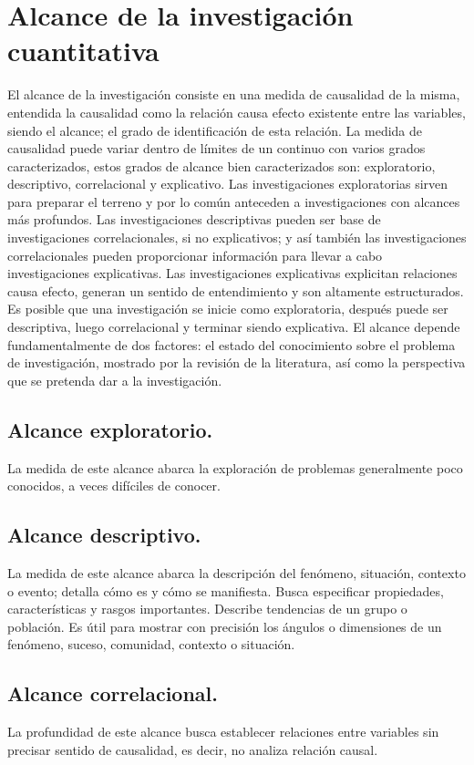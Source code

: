 \section{Alcance de la investigación cuantitativa}
El alcance de la investigación consiste en una medida de causalidad de la misma, entendida la causalidad como la relación causa efecto existente entre las variables, siendo el alcance; el grado de identificación de esta relación. La medida de causalidad puede variar dentro de límites de un continuo con varios grados caracterizados, estos grados de alcance bien caracterizados son: exploratorio, descriptivo, correlacional y explicativo. Las investigaciones exploratorias sirven para preparar el terreno y por lo común anteceden a investigaciones con alcances más profundos. Las investigaciones descriptivas pueden ser base de investigaciones correlacionales, si no explicativos; y así también las investigaciones correlacionales pueden proporcionar información para llevar a cabo investigaciones explicativas. Las investigaciones explicativas explicitan relaciones causa efecto, generan un sentido de entendimiento y son altamente estructurados. Es posible que una investigación se inicie como exploratoria, después puede ser descriptiva, luego correlacional y terminar siendo explicativa. El alcance depende fundamentalmente de dos factores: el estado del conocimiento sobre el problema de investigación, mostrado por la revisión de la literatura, así como la perspectiva que se pretenda dar a la investigación.

\subsection{Alcance exploratorio.}
La medida de este alcance abarca la exploración de problemas generalmente poco conocidos, a veces difíciles de conocer.

\subsection{Alcance descriptivo.}
La medida de este alcance abarca la descripción del fenómeno, situación, contexto o evento; detalla cómo es y cómo se manifiesta. Busca especificar propiedades, características y rasgos importantes. Describe tendencias de un grupo o población. Es útil para mostrar con precisión los ángulos o dimensiones de un fenómeno, suceso, comunidad, contexto o situación.

\subsection{Alcance correlacional.}
La profundidad de este alcance busca establecer relaciones entre variables sin precisar sentido de causalidad, es decir, no analiza relación causal.

